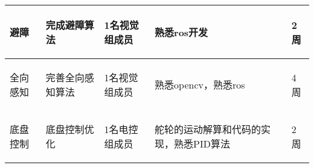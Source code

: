 \begin{longtable}{ p{2cm} | p{3cm} | p{3cm} | p{4.8cm} | p{2cm} |}
    \hline
        \begin{center}
            避障
        \end{center} &
        \begin{center}
            完成避障算法
        \end{center} &
        \begin{center}
            1名视觉组成员
        \end{center} &
        \begin{center}
           熟悉ros开发
        \end{center} &
        \begin{center}
            2周
        \end{center}\\

    \hline
    
        \begin{center}
            全向感知
        \end{center} &
        \begin{center}
            完善全向感知算法
        \end{center} &
        \begin{center}
            1名视觉组成员
        \end{center} &
        \begin{center}
            熟悉opencv，熟悉ros
        \end{center} &
        \begin{center}
            4周
        \end{center} \\
        
    \hline
    
        \begin{center}
            底盘控制
        \end{center} &
        \begin{center}
            底盘控制优化
        \end{center} &
        \begin{center}
            1名电控组成员
        \end{center} &
        \begin{center}
            舵轮的运动解算和代码的实现，熟悉PID算法
        \end{center} &
        \begin{center}
            2周
        \end{center}\\


\end{longtable}
